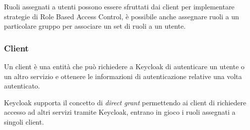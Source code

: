 Ruoli assegnati a utenti possono essere sfruttati dai client per implementare strategie di Role Based Access Control, è possibile anche assegnare ruoli a un particolare gruppo per associare un set di ruoli a un utente.

\subsubsection{Client}

Un client è una entità che può richiedere a Keycloak di autenticare un utente o un altro servizio e ottenere le informazioni di autenticazione relative una volta autenticato.

Keycloak supporta il concetto di \textit{direct grant} permettendo ai client di richiedere accesso ad altri servizi tramite Keycloak, entrano in gioco i ruoli assegnati a singoli client.

